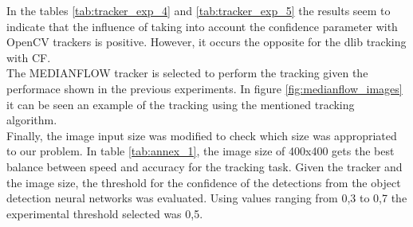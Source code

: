 In the tables \ref{tab:tracker_exp_4} and \ref{tab:tracker_exp_5} the results seem to indicate that the influence of taking into account the confidence parameter with OpenCV trackers is positive. However, it occurs the opposite for the dlib tracking with CF.\\
The MEDIANFLOW tracker is selected to perform the tracking given the performace shown in the previous experiments. In figure \ref{fig:medianflow_images} it can be seen an example of the tracking using the mentioned tracking algorithm.\\
Finally, the image input size was modified to check which size was appropriated to our problem. In table \ref{tab:annex_1}, the image size of 400x400 gets the best balance between speed and accuracy for the tracking task. Given the tracker and the image size, the threshold for the confidence of the detections from the object detection neural networks was evaluated. Using values ranging from 0,3 to 0,7 the experimental threshold selected was 0,5.
